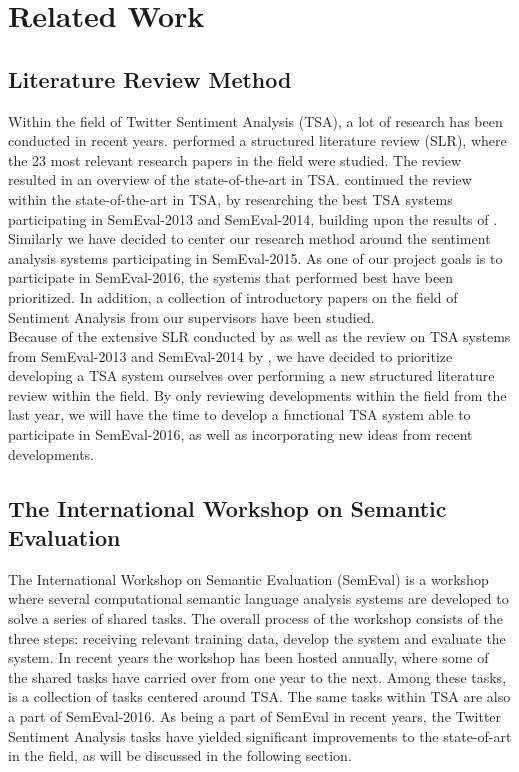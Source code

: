 \chapter{Related Work}
\label{cha:related_work}


\section{Literature Review Method}
\label{sec:literature_review_method}
Within the field of Twitter Sentiment Analysis (TSA), a lot of research has been conducted in recent years. \cite{SelmerBrevik} performed a structured literature review (SLR), where the 23 most relevant research papers in the field were studied. The review resulted in an overview of the state-of-the-art in TSA. \cite{FaretReitan} continued the review within the state-of-the-art in TSA, by researching the best TSA systems participating in SemEval-2013 and SemEval-2014, building upon the results of \cite{SelmerBrevik}. Similarly we have decided to center our research method around the sentiment analysis systems participating in SemEval-2015. As one of our project goals is to participate in SemEval-2016, the systems that performed best have been prioritized. In addition, a collection of introductory papers on the field of Sentiment Analysis from our supervisors have been studied. \\

Because of the extensive SLR conducted by \cite{SelmerBrevik} as well as the review on TSA systems from SemEval-2013 and SemEval-2014 by \cite{FaretReitan}, we have decided to prioritize developing a TSA system ourselves over performing a new structured literature review within the field. By only reviewing developments within the field from the last year, we will have the time to develop a functional TSA system able to participate in SemEval-2016, as well as incorporating new ideas from recent developments. 


\section{The International Workshop on Semantic Evaluation}
The International Workshop on Semantic Evaluation (SemEval) is a workshop where several computational semantic language analysis systems are developed to solve a series of shared tasks. The overall process of the workshop consists of the three steps: receiving relevant training data, develop the system and evaluate the system. In recent years the workshop has been hosted annually, where some of the shared tasks have carried over from one year to the next. Among these tasks, is a collection of tasks centered around TSA. The same tasks within TSA are also a part of SemEval-2016. As being a part of SemEval in recent years, the Twitter Sentiment Analysis tasks have yielded significant improvements to the state-of-art in the field, as will be discussed in the following section.    


